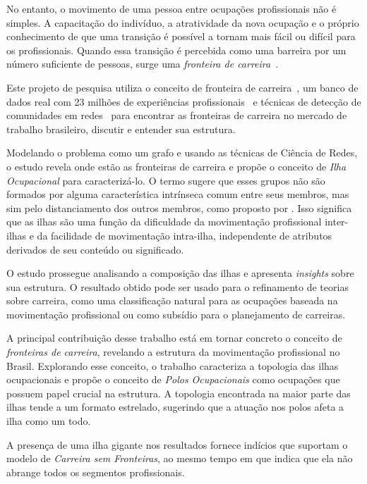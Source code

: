 \documentclass[12pt,a4paper]{article}
\begin{document}
No entanto, o movimento de uma pessoa entre ocupações profissionais não é simples. A capacitação do indivíduo, a atratividade da nova ocupação e o próprio conhecimento de que uma transição é possível a tornam mais fácil ou difícil para os profissionais. Quando essa transição é percebida como uma barreira por um número suficiente de pessoas, surge uma \textit{fronteira de carreira}~\cite{Gunz2007-hr}.

Este projeto de pesquisa utiliza o conceito de fronteira de carreira~\cite{Gunz2007-hr}, um banco de dados real com 23 milhões de experiências profissionais~\cite{VAGAS_Tecnologia2014-yv} e técnicas de detecção de comunidades em redes~\cite{Rosvall2009-sd,Edler2017-kt} para encontrar as fronteiras de carreira no mercado de trabalho brasileiro, discutir e entender sua estrutura.

Modelando o problema como um grafo e usando as técnicas de Ciência de Redes, o estudo revela onde estão as fronteiras de carreira e propõe o conceito de \textit{Ilha Ocupacional} para caracterizá-lo. O termo sugere que esses grupos não são formados por alguma característica intrínseca comum entre seus membros, mas sim pelo distanciamento dos outros membros, como proposto por . Isso significa que as ilhas são uma função da dificuldade da movimentação profissional inter-ilhas e da facilidade de movimentação intra-ilha, independente de atributos derivados de seu conteúdo ou significado.

O estudo prossegue analisando a composição das ilhas e apresenta \textit{insights} sobre sua estrutura. O resultado obtido pode ser usado para o refinamento de teorias sobre carreira, como uma classificação natural para as ocupações baseada na movimentação profissional ou como subsídio para o planejamento de carreiras.

A principal contribuição desse trabalho está em tornar concreto o conceito de \textit{fronteiras de carreira}, revelando a estrutura da movimentação profissional no Brasil. Explorando esse conceito, o trabalho caracteriza a topologia das ilhas ocupacionais e propõe o conceito de \textit{Polos Ocupacionais} como ocupações que possuem papel crucial na estrutura. A topologia encontrada na maior parte das ilhas tende a um formato estrelado, sugerindo que a atuação nos polos afeta a ilha como um todo.

A presença de uma ilha gigante nos resultados fornece indícios que suportam o modelo de \textit{Carreira sem Fronteiras}, ao mesmo tempo em que indica que ela não abrange todos os segmentos profissionais.
\end{document}
